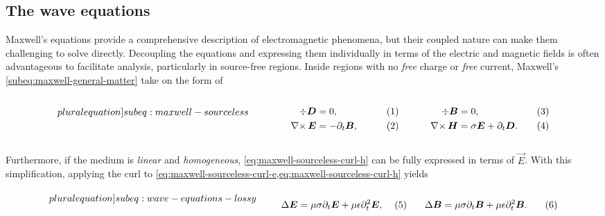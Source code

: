 \documentclass[11pt,a4paper,twoside,openany]{report}
\begin{document}
\subsection{The wave equations}
\label{subsection:the-wave-equations}
Maxwell's equations provide a comprehensive description of electromagnetic phenomena, but their coupled nature can make them challenging to solve directly. Decoupling the equations and expressing them individually in terms of the electric and magnetic fields is often advantageous to facilitate analysis, particularly in source-free regions. Inside regions with no \emph{free} charge or \emph{free} current, Maxwell's \cref{subeq:maxwell-general-matter} take on the form of\\
\begin{subequations}
    \label[pluralequation]{subeq:maxwell-sourceless}
    \noindent\centering
    \begin{minipage}{0.45\textwidth}
        \begin{align}
            \label{eq:maxwell-sourceless-div-d}
            \div \vec D &= 0,
        \\
            \label{eq:maxwell-sourceless-curl-e}
            \curl \vec E &= -\partial_t\vec B,
        \end{align}
    \end{minipage}
    \hfill
    \begin{minipage}{0.45\textwidth}
        \begin{align}
            \label{eq:maxwell-sourceless-div-b}
            \div\vec B &= 0,
        \\
            \label{eq:maxwell-sourceless-curl-h}
            \curl\vec H &= \sigma\vec E + \partial_t\vec D.
        \end{align}
    \end{minipage}\bigskip
\end{subequations}\\
Furthermore, if the medium is \emph{linear} and \emph{homogeneous}, \cref{eq:maxwell-sourceless-curl-h} can be fully expressed in terms of $\vec E$. With this simplification, applying the curl to \cref{eq:maxwell-sourceless-curl-e,eq:maxwell-sourceless-curl-h} yields\\
\begin{subequations}
    \label[pluralequation]{subeq:wave-equations-lossy}
    \noindent\centering
    \begin{minipage}{0.45\textwidth}
        \begin{align}
            \label{eq:wave-equation-e}
            \Delta\vec E &= \mu\sigma\partial_t\vec E + \mu\epsilon\partial^2_t\vec E,
        \end{align}
    \end{minipage}
    \hfill
    \begin{minipage}{0.45\textwidth}
        \begin{align}
            \label{eq:wave-equation-b}
            \Delta\vec B &= \mu\sigma\partial_t\vec B + \mu\epsilon\partial^2_t\vec B.
        \end{align}
    \end{minipage}\bigskip
\end{subequations}
\end{document}
